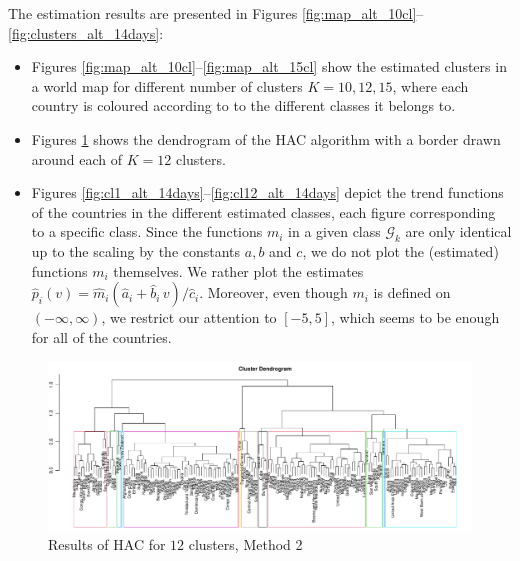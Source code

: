\documentclass[a4paper,12pt]{article}
\numberwithin{equation}{section}
\begin{document}
The estimation results are presented in Figures \ref{fig:map_alt_10cl}--\ref{fig:clusters_alt_14days}:
\begin{itemize}[leftmargin=0.6cm]
\item Figures \ref{fig:map_alt_10cl}--\ref{fig:map_alt_15cl} show the estimated clusters in a world map for different number of clusters $K =10, 12, 15$, where each country is coloured according to to the different classes it belongs to. 
\item Figures \ref{fig:dend_alt} shows the dendrogram of the HAC algorithm with a border drawn around each of $K = 12$ clusters.
\item Figures \ref{fig:cl1_alt_14days}--\ref{fig:cl12_alt_14days} depict the trend functions of the countries in the different estimated classes, each figure corresponding to a specific class. Since the functions $m_i$ in a given class $\mathcal{G}_k$ are only identical up to the scaling by the constants $a, b$ and $c$, we do not plot the (estimated) functions $m_i$ themselves. We rather plot the estimates $\hat{p}_i(v) = \hat{m}_i(\hat{a}_i + \hat{b}_i \, v)/\hat{c}_i$. Moreover, even though $m_i$ is defined on $(-\infty, \infty)$, we restrict our attention to $[-5, 5]$, which seems to be enough for all of the countries.
\end{itemize}

\newpage 
\FloatBarrier
\begin{figure}
\includegraphics[width=\textwidth]{plots/14days/dendrogram_alt}
\caption{Results of HAC for $12$ clusters, Method 2}\label{fig:dend_alt}
\end{figure}
\end{document}
